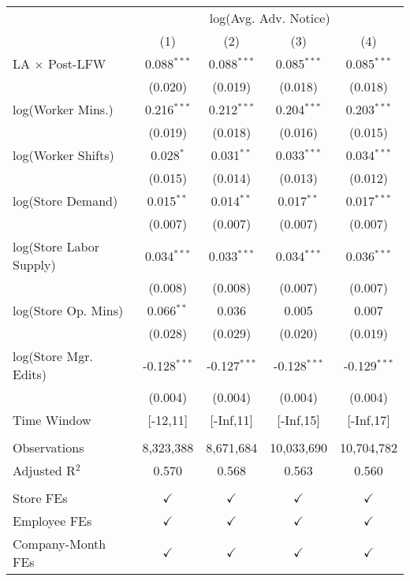 
\begingroup
\centering
\scriptsize
\begin{tabular}{lcccc}
   \toprule
    & \multicolumn{4}{c}{log(Avg. Adv. Notice)}\\
                           & (1)            & (2)            & (3)            & (4)\\  
   \midrule 
    LA $\times$ Post-LFW    & 0.088$^{***}$  & 0.088$^{***}$  & 0.085$^{***}$  & 0.085$^{***}$\\   
                           & (0.020)        & (0.019)        & (0.018)        & (0.018)\\   
   log(Worker Mins.)              & 0.216$^{***}$  & 0.212$^{***}$  & 0.204$^{***}$  & 0.203$^{***}$\\   
                           & (0.019)        & (0.018)        & (0.016)        & (0.015)\\   
   log(Worker Shifts)             & 0.028$^{*}$    & 0.031$^{**}$   & 0.033$^{***}$  & 0.034$^{***}$\\   
                           & (0.015)        & (0.014)        & (0.013)        & (0.012)\\   
   log(Store Demand)       & 0.015$^{**}$   & 0.014$^{**}$   & 0.017$^{**}$   & 0.017$^{***}$\\   
                           & (0.007)        & (0.007)        & (0.007)        & (0.007)\\   
   log(Store Labor Supply) & 0.034$^{***}$  & 0.033$^{***}$  & 0.034$^{***}$  & 0.036$^{***}$\\   
                           & (0.008)        & (0.008)        & (0.007)        & (0.007)\\   
   log(Store Op. Mins)     & 0.066$^{**}$   & 0.036          & 0.005          & 0.007\\   
                           & (0.028)        & (0.029)        & (0.020)        & (0.019)\\   
   log(Store Mgr. Edits)   & -0.128$^{***}$ & -0.127$^{***}$ & -0.128$^{***}$ & -0.129$^{***}$\\   
                           & (0.004)        & (0.004)        & (0.004)        & (0.004)\\   
   Time Window             & [-12,11]       & [-Inf,11]      & [-Inf,15]      & [-Inf,17]\\  
    \\
   Observations            & 8,323,388      & 8,671,684      & 10,033,690     & 10,704,782\\  
   Adjusted R$^2$          & 0.570          & 0.568          & 0.563          & 0.560\\  
    \\
   Store FEs               & $\checkmark$   & $\checkmark$   & $\checkmark$   & $\checkmark$\\   
   Employee FEs            & $\checkmark$   & $\checkmark$   & $\checkmark$   & $\checkmark$\\   
   Company-Month FEs       & $\checkmark$   & $\checkmark$   & $\checkmark$   & $\checkmark$\\   
   \bottomrule
\end{tabular}
\par\endgroup


